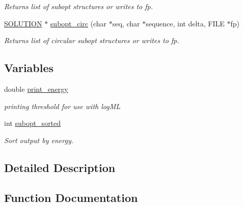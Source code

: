 \begin{DoxyCompactItemize}
\begin{DoxyCompactList}\small\item\em Returns list of subopt structures or writes to fp. \end{DoxyCompactList}\item 
\hyperlink{subopt_8h_aa0f46ff02e1017469cf902d02ecd7f9a}{S\+O\+L\+U\+T\+I\+ON} $\ast$ \hyperlink{group__subopt__wuchty_ga8634516e4740e0b6c9a46d2bae940340}{subopt\+\_\+circ} (char $\ast$seq, char $\ast$sequence, int delta, F\+I\+LE $\ast$fp)
\begin{DoxyCompactList}\small\item\em Returns list of circular subopt structures or writes to fp. \end{DoxyCompactList}\end{DoxyCompactItemize}
\subsection*{Variables}
\begin{DoxyCompactItemize}
\item 
double \hyperlink{group__subopt__wuchty_ga5e57d914bcb5feeecdf520e25313fcfe}{print\+\_\+energy}\hypertarget{group__subopt__wuchty_ga5e57d914bcb5feeecdf520e25313fcfe}{}\label{group__subopt__wuchty_ga5e57d914bcb5feeecdf520e25313fcfe}

\begin{DoxyCompactList}\small\item\em printing threshold for use with log\+ML \end{DoxyCompactList}\item 
int \hyperlink{group__subopt__wuchty_ga873cf8ed69e0437f8efa8b1fec854a0e}{subopt\+\_\+sorted}\hypertarget{group__subopt__wuchty_ga873cf8ed69e0437f8efa8b1fec854a0e}{}\label{group__subopt__wuchty_ga873cf8ed69e0437f8efa8b1fec854a0e}

\begin{DoxyCompactList}\small\item\em Sort output by energy. \end{DoxyCompactList}\end{DoxyCompactItemize}


\subsection{Detailed Description}


\subsection{Function Documentation}
